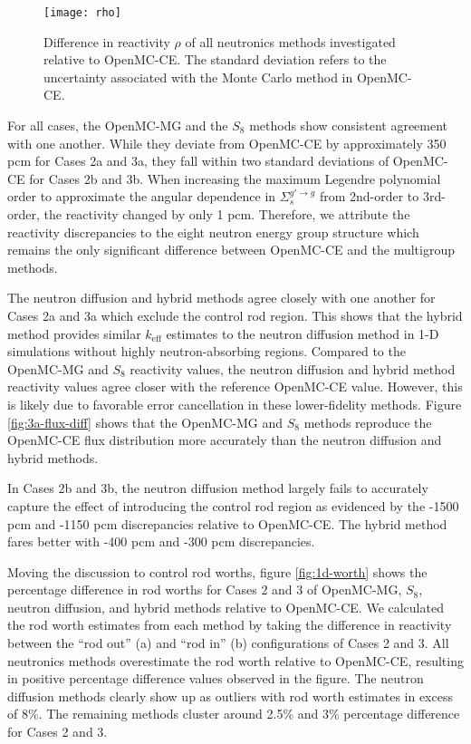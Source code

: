 \begin{figure}[htb!]
  \centering
  \texttt{[image: rho]}
  \caption{Difference in reactivity $\rho$ of all neutronics methods investigated relative
  to OpenMC-CE. The standard deviation refers to the uncertainty associated with the Monte Carlo
  method in OpenMC-CE.}
  \label{fig:1d-rho}
\end{figure}

For all cases, the OpenMC-MG and the $S_8$ methods show consistent agreement with one another. 
While they deviate from OpenMC-CE by approximately 350 pcm for Cases 2a and 3a, they fall within
two standard deviations of OpenMC-CE for Cases 2b and 3b. When increasing the maximum Legendre
polynomial order to approximate the angular dependence in $\Sigma_s^{g'\rightarrow g}$ from
2nd-order to 3rd-order, the reactivity changed by only 1 pcm. Therefore, we attribute the
reactivity discrepancies to the eight neutron energy group structure which remains the
only significant difference between OpenMC-CE and the multigroup methods.

The neutron diffusion and hybrid methods agree closely with one another for Cases 2a and 3a which
exclude the control rod region. This shows that the hybrid method provides similar $k_\text{eff}$
estimates to the neutron diffusion method in 1-D simulations without highly neutron-absorbing
regions. Compared to the OpenMC-MG and $S_8$ reactivity values, the neutron diffusion and hybrid
method reactivity values agree closer with the reference OpenMC-CE value. However, this is likely
due to favorable error cancellation in these lower-fidelity methods. Figure \ref{fig:3a-flux-diff}
shows that the OpenMC-MG and $S_8$ methods reproduce
the OpenMC-CE flux distribution more accurately than the neutron diffusion and hybrid methods.

In Cases 2b and 3b, the neutron diffusion method largely fails to accurately capture the
effect of introducing the control rod region as evidenced by the -1500 pcm and -1150 pcm
discrepancies relative to OpenMC-CE. The hybrid method fares better with -400 pcm and -300 pcm
discrepancies.


Moving the discussion to control rod worths, figure \ref{fig:1d-worth} shows the percentage
difference in rod worths for Cases 2 and 3 of OpenMC-MG, $S_8$, neutron diffusion, and hybrid
methods relative to OpenMC-CE. We calculated the rod worth estimates from each method by taking the
difference in reactivity between the ``rod out'' (a) and ``rod in'' (b) configurations of Cases 2
and 3. All neutronics methods overestimate the rod worth relative to OpenMC-CE, resulting in
positive percentage difference values observed in the figure.
The neutron diffusion methods clearly show up as outliers with rod worth estimates in excess
of 8\%. The remaining methods cluster around 2.5\% and 3\% percentage difference for Cases
2 and 3.

